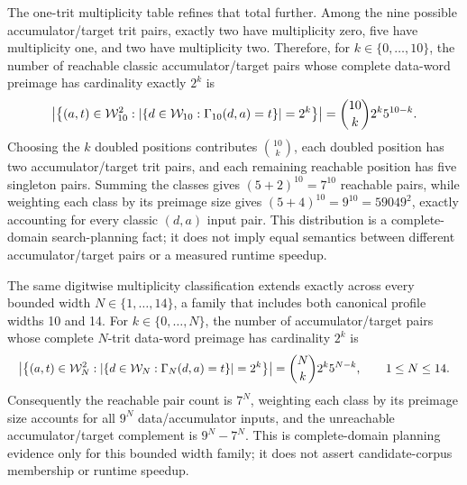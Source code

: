 \documentclass{article}
\newcommand{\fitmath}[1]{\resizebox{0.99\linewidth}{!}{$\displaystyle #1$}}
\begin{document}
The one-trit multiplicity table refines that total further. Among the nine
possible accumulator/target trit pairs, exactly two have multiplicity zero,
five have multiplicity one, and two have multiplicity two. Therefore, for
$k\in\{0,\ldots,10\}$, the number of reachable classic accumulator/target
pairs whose complete data-word preimage has cardinality exactly $2^k$ is
\begin{equation}
  \left|\left\{(a,t)\in\mathcal{W}_{10}^{2}:
    \left|\left\{d\in\mathcal{W}_{10}:\Gamma_{10}\!\left(d,a\right)=t
    \right\}\right|
      =2^k
  \right\}\right|
    =\binom{10}{k}2^k5^{10-k}.
  \label{eq:optimization-crazy-preimage-pair-distribution}
\end{equation}
Choosing the $k$ doubled positions contributes $\binom{10}{k}$, each doubled
position has two accumulator/target trit pairs, and each remaining reachable
position has five singleton pairs. Summing the classes gives
$(5+2)^{10}=7^{10}$ reachable pairs, while weighting each class by its preimage
size gives $(5+4)^{10}=9^{10}=59049^2$, exactly accounting for every classic
$(d,a)$ input pair. This distribution is a complete-domain search-planning fact;
it does not imply equal semantics between different accumulator/target pairs or
a measured runtime speedup.

The same digitwise multiplicity classification extends exactly across every
bounded width $N\in\{1,\ldots,14\}$, a family that includes both canonical
profile widths 10 and 14. For $k\in\{0,\ldots,N\}$, the number of
accumulator/target pairs whose complete
$N$-trit data-word preimage has cardinality $2^k$ is
\begin{equation}
  \fitmath{%
    \left|\left\{(a,t)\in\WordDomain{N}^{2}:
      \left|\left\{d\in\WordDomain{N}:\CrazyN{N}{d}{a}=t
      \right\}\right|=2^k
    \right\}\right|
      =\binom{N}{k}2^k5^{N-k},
    \qquad 1\leq N\leq14.
  }
  \label{eq:optimization-crazy-profile-preimage-pair-distribution}
\end{equation}
Consequently the reachable pair count is $7^N$, weighting each class by its
preimage size accounts for all $9^N$ data/accumulator inputs, and the
unreachable accumulator/target complement is $9^N-7^N$. This is complete-domain
planning
evidence only for this bounded width family; it does not assert candidate-corpus
membership or runtime speedup.
\end{document}
